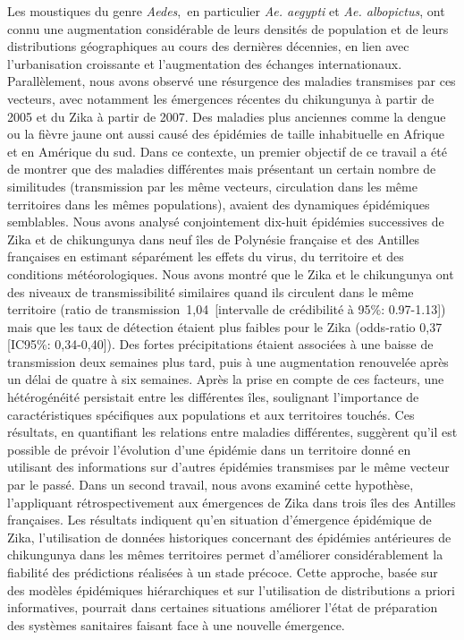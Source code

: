 Les moustiques du genre \textit{Aedes}, en particulier \textit{Ae. aegypti} et \textit{Ae. albopictus}, ont connu une augmentation considérable de leurs densités de population et de leurs distributions géographiques au cours des dernières décennies, en lien avec l’urbanisation croissante et l’augmentation des échanges internationaux. 
Parallèlement, nous avons observé une résurgence des maladies transmises par ces vecteurs, avec notamment les émergences récentes du chikungunya à partir de 2005 et du Zika à  partir de 2007.
Des maladies plus anciennes comme la dengue ou la fièvre jaune ont aussi causé des épidémies de taille inhabituelle en Afrique et en Amérique du sud.
Dans ce contexte, un premier objectif de ce travail a été de montrer que des maladies différentes mais présentant un certain nombre de similitudes (transmission par les même vecteurs, circulation dans les même territoires dans les mêmes populations), avaient des dynamiques épidémiques semblables.
Nous avons analysé conjointement dix-huit épidémies successives de Zika et de chikungunya dans neuf îles de Polynésie française et des Antilles françaises en estimant séparément les effets du virus, du territoire et des conditions météorologiques. 
Nous avons montré que le Zika et le chikungunya ont des niveaux de transmissibilité similaires quand ils circulent dans le même territoire (ratio de transmission 1,04 [intervalle de crédibilité à 95\%: 0.97-1.13]) mais que les taux de détection étaient plus faibles pour le Zika (odds-ratio 0,37 [IC95\%: 0,34-0,40]). 
Des fortes précipitations étaient associées à une baisse de transmission deux semaines plus tard, puis à une augmentation renouvelée après un délai de quatre à six semaines. 
Après la prise en compte de ces facteurs, une hétérogénéité persistait entre les différentes îles, soulignant l'importance de caractéristiques spécifiques aux populations et aux territoires touchés.
Ces résultats, en quantifiant les relations entre maladies différentes, suggèrent qu'il est possible de prévoir l'évolution d'une épidémie dans un territoire donné en utilisant des informations sur d'autres épidémies transmises par le même vecteur par le passé. 
Dans un second travail, nous avons examiné cette hypothèse, l'appliquant rétrospectivement aux émergences de Zika dans trois îles des Antilles françaises.
Les résultats indiquent qu'en situation d’émergence épidémique de Zika, l’utilisation de données historiques concernant des épidémies antérieures de chikungunya dans les mêmes territoires permet d’améliorer considérablement la fiabilité des prédictions réalisées à un stade précoce.
Cette approche, basée sur des modèles épidémiques hiérarchiques et sur l'utilisation de distributions a priori informatives, pourrait dans certaines situations améliorer l'état de préparation des systèmes sanitaires faisant face à une nouvelle émergence.

